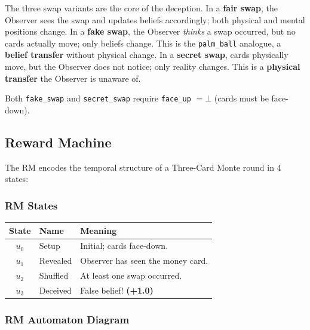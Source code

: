 \documentclass[letterpaper, 10 pt, conference]{ieeeconf}  %
\begin{document}
The three swap variants are the core of the deception.
In a \textbf{fair swap}, the Observer sees the swap and updates beliefs accordingly; both physical and mental positions change.
In a \textbf{fake swap}, the Observer \emph{thinks} a swap occurred, but no cards actually move; only beliefs change. This is the \texttt{palm\_ball} analogue, a \textbf{belief transfer} without physical change.
In a \textbf{secret swap}, cards physically move, but the Observer does not notice; only reality changes. This is a \textbf{physical transfer} the Observer is unaware of.

Both \texttt{fake\_swap} and \texttt{secret\_swap} require \texttt{face\_up} $= \bot$ (cards must be face-down).

\subsection{Reward Machine}

The RM encodes the temporal structure of a Three-Card Monte round in 4 states:

\subsubsection{RM States}

\begin{center}
\begin{tabular}{cll}
\toprule
\textbf{State} & \textbf{Name} & \textbf{Meaning} \\
\midrule
$u_0$ & Setup & Initial; cards face-down. \\
$u_1$ & Revealed & Observer has seen the money card. \\
$u_2$ & Shuffled & At least one swap occurred. \\
$u_3$ & Deceived & False belief! \textbf{(+1.0)} \\
\bottomrule
\end{tabular}
\end{center}

\subsubsection{RM Automaton Diagram}

\begin{center}
\end{center}
\end{document}
